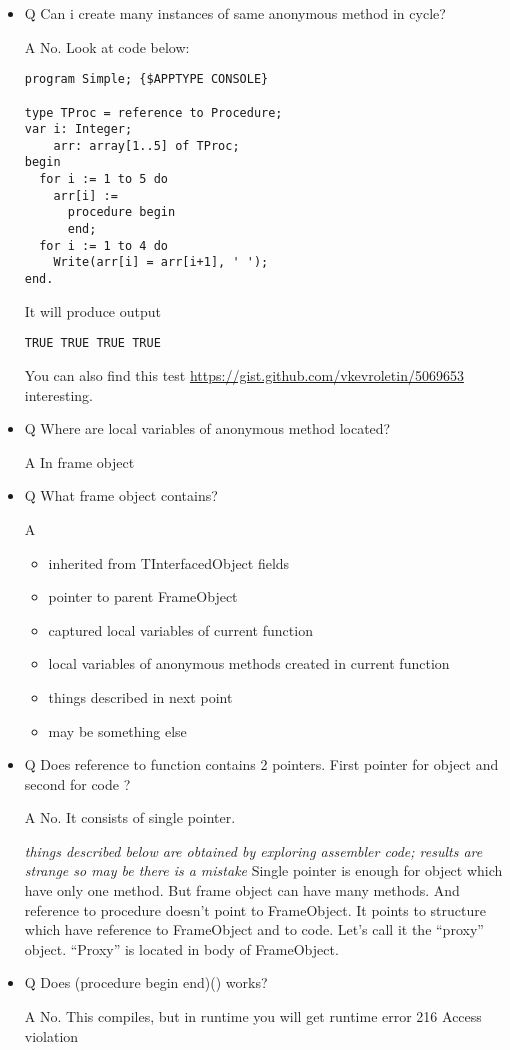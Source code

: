 \documentclass[11pt]{article}
\begin{document}
\begin{itemize}
\item Q Can i create many instances of same anonymous method in cycle?
  
  A No. Look at code below:

\begin{verbatim}
program Simple; {$APPTYPE CONSOLE}

type TProc = reference to Procedure;
var i: Integer;
    arr: array[1..5] of TProc;
begin
  for i := 1 to 5 do
    arr[i] :=
      procedure begin
      end;
  for i := 1 to 4 do
    Write(arr[i] = arr[i+1], ' ');
end.
\end{verbatim}
  It will produce output

\begin{verbatim}
TRUE TRUE TRUE TRUE
\end{verbatim}

  You can also find this test
  \href{https://gist.github.com/vkevroletin/5069653}{https://gist.github.com/vkevroletin/5069653} interesting.
\item Q Where are local variables of anonymous method located?

  A In frame object
\item Q What frame object contains?

  A
\begin{itemize}
\item inherited from TInterfacedObject fields
\item pointer to parent FrameObject
\item captured local variables of current function
\item local variables of anonymous methods created in current function
\item things described in next point
\item may be something else
\end{itemize}
\item Q Does reference to function contains 2 pointers. First pointer
  for object and second for code ?
 
  A No. It consists of single pointer.

  \emph{things described below are obtained by exploring    assembler code; results are strange so may be there is a mistake}
  Single pointer is enough for object which have only one method. But
  frame object can have many methods. And reference to procedure
  doesn't point to FrameObject. It points to structure which have
  reference to FrameObject and to code. Let's call it the ``proxy''
  object. ``Proxy'' is located in body of FrameObject.
\item Q Does (procedure begin end)() works?

  A No. This compiles, but in runtime you will get
   runtime error 216
   Access violation
\end{itemize}
\end{document}
